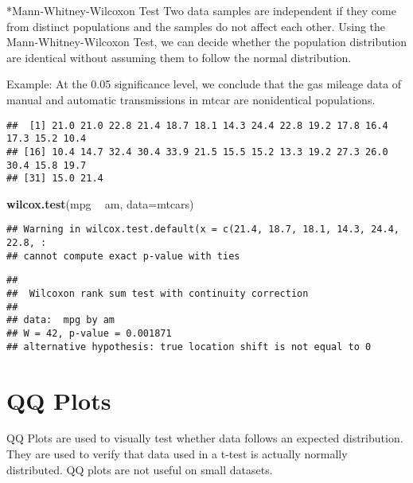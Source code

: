 \documentclass[]{article}
\newenvironment{Shaded}{\begin{snugshade}}{\end{snugshade}}
\newcommand{\DataTypeTok}[1]{\textcolor[rgb]{0.13,0.29,0.53}{#1}}
\newcommand{\KeywordTok}[1]{\textcolor[rgb]{0.13,0.29,0.53}{\textbf{#1}}}
\newcommand{\NormalTok}[1]{#1}
\newcommand{\OperatorTok}[1]{\textcolor[rgb]{0.81,0.36,0.00}{\textbf{#1}}}
\newcommand{\StringTok}[1]{\textcolor[rgb]{0.31,0.60,0.02}{#1}}
\begin{document}
*Mann-Whitney-Wilcoxon Test Two data samples are independent if they
come from distinct populations and the samples do not affect each other.
Using the Mann-Whitney-Wilcoxon Test, we can decide whether the
population distribution are identical without assuming them to follow
the normal distribution.

Example: At the 0.05 significance level, we conclude that the gas
mileage data of manual and automatic transmissions in mtcar are
nonidentical populations.

\begin{Shaded}
\end{Shaded}

\begin{verbatim}
##  [1] 21.0 21.0 22.8 21.4 18.7 18.1 14.3 24.4 22.8 19.2 17.8 16.4 17.3 15.2 10.4
## [16] 10.4 14.7 32.4 30.4 33.9 21.5 15.5 15.2 13.3 19.2 27.3 26.0 30.4 15.8 19.7
## [31] 15.0 21.4
\end{verbatim}

\begin{Shaded}
\begin{Highlighting}[]
\KeywordTok{wilcox.test}\NormalTok{(mpg }\OperatorTok{~}\StringTok{ }\NormalTok{am, }\DataTypeTok{data=}\NormalTok{mtcars)}
\end{Highlighting}
\end{Shaded}

\begin{verbatim}
## Warning in wilcox.test.default(x = c(21.4, 18.7, 18.1, 14.3, 24.4, 22.8, :
## cannot compute exact p-value with ties
\end{verbatim}

\begin{verbatim}
## 
##  Wilcoxon rank sum test with continuity correction
## 
## data:  mpg by am
## W = 42, p-value = 0.001871
## alternative hypothesis: true location shift is not equal to 0
\end{verbatim}

\hypertarget{qq-plots}{%
\section{QQ Plots}\label{qq-plots}}

QQ Plots are used to visually test whether data follows an expected
distribution. They are used to verify that data used in a t-test is
actually normally distributed. QQ plots are not useful on small
datasets.
\end{document}
